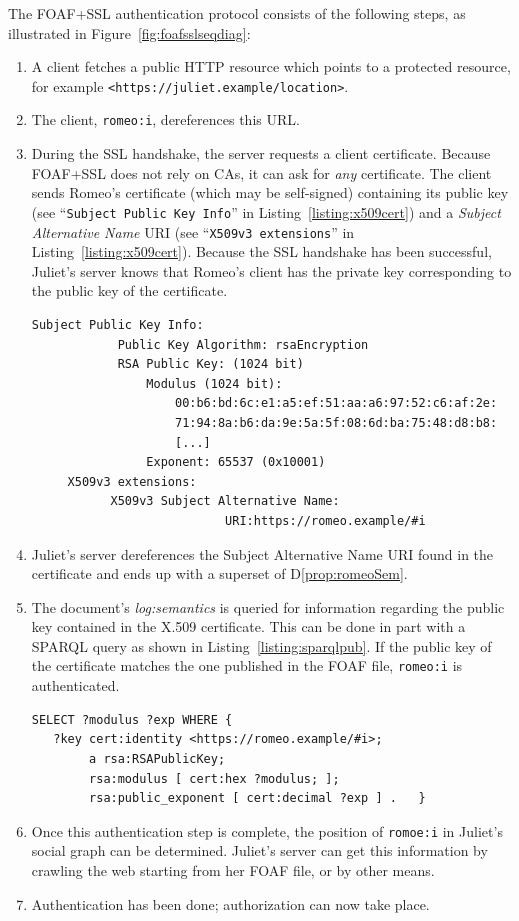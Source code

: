 \documentclass{llncs}
\begin{document}
The FOAF+SSL authentication protocol consists of the following steps,
as illustrated in Figure~\ref{fig:foafsslseqdiag}:

\begin{enumerate}
\item A client fetches a public HTTP resource which points to a
  protected resource, for example {\tt <https://juliet.example/location>}.
\item The client, {\tt romeo:i}, dereferences this URL.
\item During the SSL handshake, the
  server requests a client certificate. Because FOAF+SSL does not rely
  on CAs, it can ask for {\em any} certificate.  The client sends
  Romeo's certificate (which may be self-signed) containing its public
  key (see ``{\tt Subject Public Key Info}'' in
  Listing~\ref{listing:x509cert}) and a {\em Subject Alternative Name}
  URI (see ``{\tt X509v3 extensions}'' in
  Listing~\ref{listing:x509cert}).  Because the SSL handshake has been
  successful, Juliet's server knows that Romeo's client has the
  private key corresponding to the public key of the certificate.
\begin{lstlisting}[basicstyle=\rm\scriptsize\ttfamily,label={listing:x509cert},caption={Excerpt of a text representation of a FOAF+SSL certificate.}]
     Subject Public Key Info:
            Public Key Algorithm: rsaEncryption
            RSA Public Key: (1024 bit)
                Modulus (1024 bit):
                    00:b6:bd:6c:e1:a5:ef:51:aa:a6:97:52:c6:af:2e:
                    71:94:8a:b6:da:9e:5a:5f:08:6d:ba:75:48:d8:b8:
                    [...]     
                Exponent: 65537 (0x10001)
     X509v3 extensions:
           X509v3 Subject Alternative Name: 
                           URI:https://romeo.example/#i
\end{lstlisting}
\item Juliet's server dereferences the Subject Alternative Name URI
  found in the certificate and ends up with a superset of D\ref{prop:romeoSem}.
\item The document's {\em log:semantics} is queried for information
  regarding the public key contained in the X.509 certificate.  
  This can be done in part with a SPARQL query
  as shown in Listing~\ref{listing:sparqlpub}.  If the public key of
  the certificate matches the one published in the
  FOAF file, {\tt romeo:i} is authenticated.
  \begin{lstlisting}[basicstyle=\rm\scriptsize\ttfamily,label={listing:sparqlpub},caption={SPARQL query to obtain the public key information.}]
SELECT ?modulus ?exp WHERE { 
   ?key cert:identity <https://romeo.example/#i>;
        a rsa:RSAPublicKey;
        rsa:modulus [ cert:hex ?modulus; ];
        rsa:public_exponent [ cert:decimal ?exp ] .   }            
\end{lstlisting}
\item Once this authentication step is complete, the position of {\tt romoe:i} in 
  Juliet's social graph can be determined. Juliet's server can get this information
  by crawling the web starting from her FOAF file, or by other means.
\item Authentication has been done; authorization can now take place.
\end{enumerate}
\end{document}
